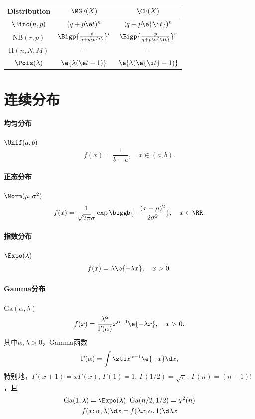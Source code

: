 \begin{center}
	\begin{tabular}{ccc}
		\toprule
		Distribution&$\MGF(X)$&$\CF(X)$\\
		\midrule
		$\Bino(n,p)$&$(q+p\e t)^n$&$(q+p\e{\i t})^n$\\
		$\mathrm{NB}(r,p)$&$\Bigp{\frac p{q+p\e{t}}}^r$&$\Bigp{\frac p{q+p\e{\i t}}}^r$\\
		$\mathrm H(n,N,M)$&-&-\\
		$\Pois(\lambda)$&$\e{\lambda(\e t-1)}$&$\e{\lambda(\e{\i t}-1)}$\\
		\bottomrule
	\end{tabular}
\end{center}

\section{连续分布}

\paragraph{均匀分布}

$\Unif(a,b)$
\begin{equation}
	f(x)=\frac1{b-a},\quad x\in(a,b).
\end{equation}

\paragraph{正态分布}

$\Norm(\mu,\sigma^2)$
\begin{equation}
	f(x)=\frac1{\sqrt{2\pi}\sigma}\exp\biggb{-\frac{(x-\mu)^2}{2\sigma^2}},\quad x\in\RR.
\end{equation}

\paragraph{指数分布}

$\Expo(\lambda)$
\begin{equation}
	f(x)=\lambda\e{-\lambda x},\quad x>0.
\end{equation}

\paragraph{Gamma分布}

$\mathrm{Ga}(\alpha,\lambda)$
\begin{equation}
	f(x)=\frac{\lambda^\alpha}{\Gamma(\alpha)}x^{\alpha-1}\e{-\lambda x},\quad x>0.
\end{equation}
其中$\alpha,\lambda>0$，Gamma函数
\[
	\Gamma(\alpha)=\int\zti x^{\alpha-1}\e{-x}\d x,
\]
特别地，$\Gamma(x+1)=x\Gamma(x),\,\Gamma(1)=1,\,\Gamma(1/2)=\sqrt\pi,\,\Gamma(n)=(n-1)!$，且
\begin{gather*}
	\mathrm{Ga}(1,\lambda)=\Expo(\lambda),\,\mathrm{Ga}(n/2,1/2)=\chi^2(n)\\
	f(x;\alpha,\lambda)\d x=f(\lambda x;\alpha,1)\d\lambda x
\end{gather*}

